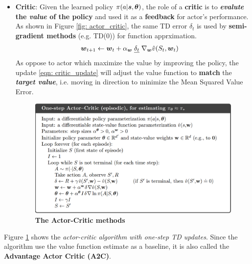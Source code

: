 \documentclass[11pt]{article}
\begin{document}
\begin{itemize}
\item \textbf{Critic}: Given the learned policy $\pi(a|\boldsymbol{s}, \boldsymbol{\theta})$, the role of a \textbf{critic} is to \textbf{\emph{evalute} the \emph{value} of the policy} and used it as a \textbf{feedback} for actor's performance. As shown in Figure \ref{fig: actor_critic}, the same TD error $\delta_t$ is used by \textbf{semi-gradient methods} (e.g. TD(0)) for function apprximation.
\begin{align}
\boldsymbol{w}_{t+1} &\leftarrow  \boldsymbol{w}_{t} + \alpha_{\boldsymbol{w}} \;\underline{\delta_{t}}\; \nabla_{\boldsymbol{w}}{\hat{v}(S_{t}, \boldsymbol{w}_{t})}  \label{eqn: critic_update}
\end{align} As oppose to actor which maximize the value by improving the policy, the update \eqref{eqn: critic_update} will adjust the value function to \textbf{match} the \emph{\textbf{target value}}, i.e. moving in direction to minimize the Mean Squared Value Error.
\begin{figure}
\begin{minipage}[t]{1\linewidth}
  \centering
  \centerline{\includegraphics[scale = 0.3]{actor_critic_algo.png}}
\end{minipage}
\caption{\footnotesize{\textbf{The Actor-Critic methods}}}
\label{fig: actor_critic_algo}
\end{figure}
\end{itemize} Figure \ref{fig: actor_critic_algo} shows the \emph{actor-critic algorithm with one-step TD updates}. Since the algorithm use the value function estimate as a baseline, it is also called the \textbf{Advantage Actor Critic (A2C)}.
\end{document}

